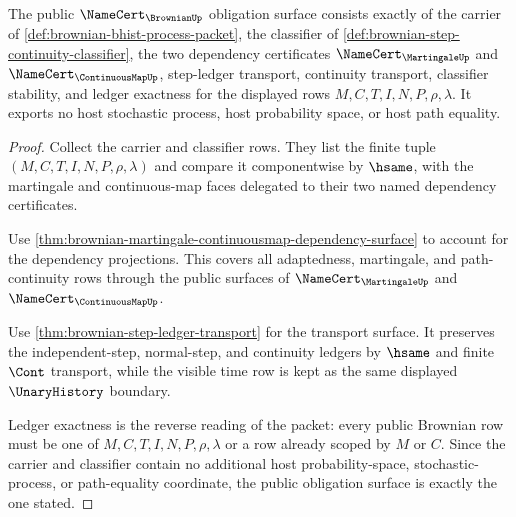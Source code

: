 \begin{theorem}
\label{thm:brownian-namecert-obligation-surface}
The public $\NameCert_{\BrownianUp}$ obligation surface consists exactly of
the carrier of \autoref{def:brownian-bhist-process-packet}, the classifier of
\autoref{def:brownian-step-continuity-classifier}, the two dependency
certificates $\NameCert_{\MartingaleUp}$ and $\NameCert_{\ContinuousMapUp}$,
step-ledger transport, continuity transport, classifier stability, and ledger
exactness for the displayed rows $M,C,T,I,N,P,\rho,\lambda$. It exports no
host stochastic process, host probability space, or host path equality.
\end{theorem}
\begin{proof}
Collect the carrier and classifier rows. They list the finite tuple
$(M,C,T,I,N,P,\rho,\lambda)$ and compare it componentwise by $\hsame$, with
the martingale and continuous-map faces delegated to their two named
dependency certificates.

Use \autoref{thm:brownian-martingale-continuousmap-dependency-surface} to
account for the dependency projections. This covers all adaptedness,
martingale, and path-continuity rows through the public surfaces of
$\NameCert_{\MartingaleUp}$ and $\NameCert_{\ContinuousMapUp}$.

Use \autoref{thm:brownian-step-ledger-transport} for the transport
surface. It preserves the independent-step, normal-step, and continuity
ledgers by $\hsame$ and finite $\Cont$ transport, while the visible time row
is kept as the same displayed $\UnaryHistory$ boundary.

Ledger exactness is the reverse reading of the packet: every public Brownian
row must be one of $M,C,T,I,N,P,\rho,\lambda$ or a row already scoped by $M$
or $C$. Since the carrier and classifier contain no additional host
probability-space, stochastic-process, or path-equality coordinate, the
public obligation surface is exactly the one stated.
\end{proof}

